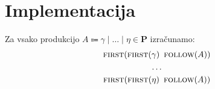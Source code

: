 \documentclass{article}
\newcommand{\FIRST}{\textsc{first}}
\newcommand{\FOLLOW}{\textsc{follow}}
\newcommand{\Set}[1]{\mathbf{#1}}
\newcommand{\Productions}{\Set{P}}
\newcommand{\Null}{\varepsilon}
\newcommand{\Language}[1]{\mathcal{L}(#1)}
\newcommand{\Arrow}{\Coloneq}
\newcommand{\Seq}{{\ \,}}
\newcommand{\Union}{\mathrel{|}}
\begin{document}
%
%



\section{Implementacija}

Za vsako produkcijo $A \Arrow \gamma \Union \dots \Union \eta \in \Productions$ izračunamo:
\begin{gather*}
  \FIRST(\FIRST(\gamma) \Seq \FOLLOW(A))\\
  \dots\\
  \FIRST(\FIRST(\eta) \Seq \FOLLOW(A))
\end{gather*}
\end{document}
